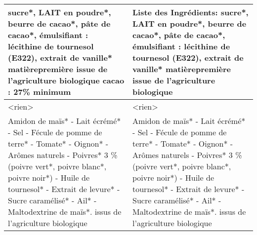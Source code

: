 \begin{longtable}{p{7cm}p{7cm}}
\bottomrule
\endlastfoot
                                                                                                 sucre*, LAIT en poudre*, beurre de cacao*, pâte de cacao*, émulsifiant : lécithine de tournesol (E322), extrait de \newline vanille* \newline * matièrepremière issue de l'agriculture biologique \newline cacao : 27\% minimum &                                                                                                                                                                                                                                                         Liste des Ingrédients: \newline sucre*,  LAIT en poudre*,  beurre de cacao*,  pâte de cacao*,  émulsifiant : lécithine de tournesol (E322),  extrait de  \newline vanille* \newline * matièrepremière issue de l'agriculture biologique \\ \hline
                                                                                                                                                                                                                                                                                                 <rien> &                                                                                                                                                                                                                                                                                                                                                                                                                                                                  <rien> \\ \hline
 Amidon de maïs* - Lait écrémé* - Sel - Fécule de pomme de terre* - Tomate* - Oignon* - Arômes naturels - Poivres* 3 \% (poivre vert*, poivre blanc*, poivre noir*) - Huile de tournesol* - Extrait de levure* - Sucre caramélisé* - Ail* - Maltodextrine de maïs*. \newline * issus de l'agriculture biologique &                                                                                                                                                               Amidon de maïs* - Lait écrémé* - Sel - Fécule de pomme de terre* - Tomate* - Oignon* - Arômes naturels - Poivres* 3 \% (poivre vert*, poivre blanc*,  \newline poivre noir*) - Huile de tournesol* - Extrait de levure* - Sucre caramélisé* - Ail* - Maltodextrine de maïs*.  \newline * issus de l’agriculture biologique \\ \hline

\end{longtable}
